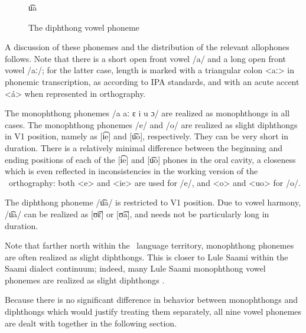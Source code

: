 \begin{figure}[h]
\centering
u͡a %
\caption[Diphthong inventory]{The diphthong vowel phoneme} \label{diphthongs}
\end{figure}

A discussion of these phonemes and the distribution of the relevant allophones follows. 
Note that there is a short open front vowel /a/ and a long open front vowel /aː/; for the latter case, length is marked with a triangular colon <aː> in phonemic transcription, as according to IPA standards, and with an acute accent <á> when represented in orthography.

The monophthong phonemes /a aː ɛ i u ɔ/ are realized as monophthongs in all cases. 
The monophthong phonemes /e/ and /o/ are realized as slight diphthongs in V1 position, namely as [i͡e] and [u͡o], %
respectively. They can be very short in duration. There is a relatively minimal difference between the beginning and ending positions of each of the [i͡e] and [u͡o] phones in the oral cavity, a closeness which is even reflected in inconsistencies in the working version of the \PS\ orthography: both <e> and <ie> are used for /e/, and <o> and <uo> for /o/. 

The diphthong phoneme /u͡a/ is restricted to V1 position. Due to vowel harmony, /u͡a/ can be realized as [ʊ͡ɛ] or [ʊ͡a], and needs not be particularly long in duration. 

Note that farther north within the \PS\ language territory, monophthong phonemes are often realized as slight diphthongs. This is closer to Lule Saami within the Saami dialect continuum; indeed, many Lule Saami monophthong vowel phonemes are realized as slight diphthongs \citep[cf., e.g.,~][11]{Spiik1989}. 

Because there is no significant difference in behavior between monophthongs and diphthongs which would justify treating them separately, all nine vowel phonemes are dealt with together in the following section.


